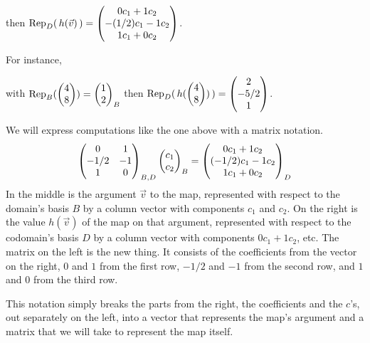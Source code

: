\begin{example}
\begin{center}
  then $\rep{\,h(\vec{v})\,}{D}
  =\colvec{0c_1+1c_2 \\ -(1/2)c_1-1c_2 \\ 1c_1+0c_2}$.
\end{center}
For instance, 
\begin{center}
  with $\rep{\colvec{4 \\ 8}}{B}=\colvec{1 \\ 2}_B$
  then 
  $\rep{\,h(\colvec{4 \\ 8})\,}{D}
   =\colvec{2 \\ -5/2 \\ 1}$.
\end{center}
\end{example}

We will express computations like the one above with a matrix notation.
\begin{equation*}
    \begin{pmatrix}
      0             &1  \\
      -1/2          &-1  \\
      1             &0
    \end{pmatrix}_{B,D}
  \colvec{c_1 \\ c_2}_B
  =
  \colvec{0c_1+1c_2 \\ (-1/2)c_1-1c_2 \\ 1c_1+0c_2}_D
\end{equation*}
In the middle is the argument $\vec{v}$ to the map, 
represented with respect to the domain's basis $B$
by a column vector with components $c_1$ and $c_2$.
On the right is the value $h(\vec{v})$ of the map on that argument,
represented with respect to the codomain's basis $D$
by a column vector with components $0c_1+1c_2$, etc.
The matrix on the left is the new thing.
It consists of the coefficients from the vector on the right,
$0$ and $1$ from the first row, $-1/2$ and $-1$ from the
second row, and $1$ and $0$ from the third row.

This notation simply breaks the parts from the right, 
the coefficients and the $c$'s, out separately on the left, into a vector that
represents the map's argument and a matrix that we will take to
represent the map itself.

